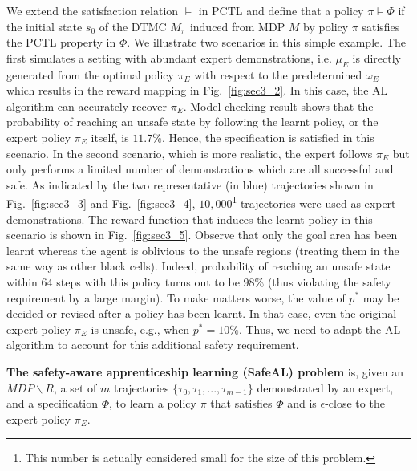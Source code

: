We extend the satisfaction relation $\models$ in PCTL and define that a policy $\pi\models\Phi$ if the initial state $s_0$ of the DTMC $M_\pi$ induced from MDP $M$ by policy $\pi$ satisfies the PCTL property in $\Phi$. We illustrate two scenarios in this simple example. The first simulates a setting with abundant expert demonstrations, i.e. $\mu_E$ is directly generated from the optimal policy $\pi_E$ with respect to the predetermined $\omega_E$ which results in the reward mapping in Fig.~\ref{fig:sec3_2}. In this case, the AL algorithm can accurately recover $\pi_E$. 
Model checking result shows that the probability of reaching an unsafe state by following the learnt policy, or the expert policy $\pi_E$ itself, is $11.7\%$. Hence, the specification is satisfied in this scenario. In the second scenario, which is more realistic, the expert follows $\pi_E$ but only performs a limited number of demonstrations which are all successful and safe. As indicated by the two representative (in blue) trajectories shown in Fig.~\ref{fig:sec3_3} and Fig.~\ref{fig:sec3_4}, $10,000$\footnote{This number is actually considered small for the size of this problem.} trajectories were used as expert demonstrations. 
The reward function that induces the learnt policy in this scenario is shown in Fig.~{\ref{fig:sec3_5}}.
Observe that only the goal area has been learnt whereas the agent is oblivious to the unsafe regions (treating them in the same way as other black cells). Indeed, probability of reaching an unsafe state within $64$ steps with this policy turns out to be $98\%$ (thus violating the safety requirement by a large margin).  
To make matters worse, the value of $p^*$ may be decided or revised after a policy has been learnt. In that case, even the original expert policy $\pi_E$ is unsafe, e.g., when $p^*=10\%$. 
Thus, we need to adapt the AL algorithm to account for this additional safety requirement. 
\begin{definition}
\textbf{The safety-aware apprenticeship learning (SafeAL) problem} is, given an $MDP\backslash R$, a set of $m$ trajectories $\{\tau_0, \tau_1, ..., \tau_{m-1}\}$ demonstrated by an expert, and a specification $\Phi$, to learn a policy $\pi$ that satisfies $\Phi$ and is $\epsilon$-close to the expert policy $\pi_E$.
\end{definition}
